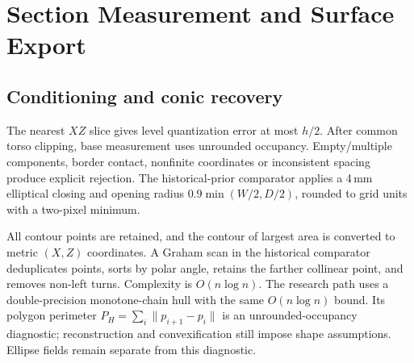 \documentclass[11pt,a4paper]{article}
\begin{document}
\section{Section Measurement and Surface Export}
\subsection{Conditioning and conic recovery}
The nearest $XZ$ slice gives level quantization error at most $h/2$. After common torso clipping, base measurement uses unrounded occupancy. Empty/multiple components, border contact, nonfinite coordinates or inconsistent spacing produce explicit rejection. The historical-prior comparator applies a 4\,mm elliptical closing and opening radius $0.9\min(W/2,D/2)$, rounded to grid units with a two-pixel minimum.

All contour points are retained, and the contour of largest area is converted to metric $(X,Z)$ coordinates. A Graham scan in the historical comparator~\cite{graham1972efficient} deduplicates points, sorts by polar angle, retains the farther collinear point, and removes non-left turns. Complexity is $O(n\log n)$. The research path uses a double-precision monotone-chain hull with the same $O(n\log n)$ bound. Its polygon perimeter $P_H=\sum_i\|p_{i+1}-p_i\|$ is an unrounded-occupancy diagnostic; reconstruction and convexification still impose shape assumptions. Ellipse fields remain separate from this diagnostic.
\end{document}
